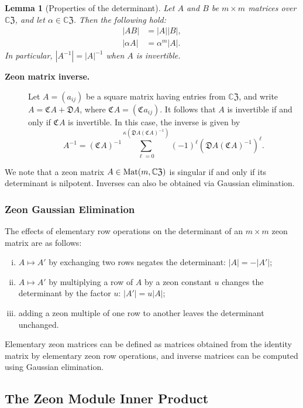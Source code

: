 \documentclass{article}
\newtheorem{lemma}[theorem]{Lemma}
\theoremstyle{definition}
\newcommand{\zco}{\mathfrak{C}\mspace{1mu}}
\newcommand{\CZ}{\mathbb{C}\mathfrak{Z}}
\newcommand{\Mat}{{\rm Mat}}
\numberwithin{equation}{section}
\begin{document}
\begin{lemma}[Properties of the determinant]
Let $A$ and $B$ be $m\times m$ matrices over $\CZ$, and let $\alpha\in\CZ$.  Then the following hold:\begin{align*}
|AB|&=|A| |B|,\\
|\alpha A|&=\alpha^m |A|.
\end{align*}
In particular, $|A^{-1}|=|A|^{-1}$ when $A$ is invertible.
\end{lemma}

\begin{description}
\item [{\bf Zeon matrix inverse.}] Let $A=(a_{ij})$ be a square matrix having entries from $\CZ$, and write $A=\zco A + \mathfrak{D}A$, where $\zco A=(\zco a_{ij})$.  It follows that $A$ is invertible if and only if $\zco A$ is invertible.  In this case, the inverse is given by \begin{equation*}
A^{-1}=(\zco A)^{-1}\sum_{\ell=0}^{\kappa(\mathfrak{D}A(\zco A)^{-1})}(-1)^\ell(\mathfrak{D}A(\zco A)^{-1})^{\ell}.
\end{equation*}
\end{description}

We note that a zeon matrix $A\in\Mat(m,\CZ)$ is singular if and only if its determinant is nilpotent.  Inverses can also be obtained via Gaussian elimination.

\subsubsection*{Zeon Gaussian Elimination}

The effects of elementary row operations on the determinant of an $m\times m$ zeon matrix are as follows:
\begin{enumerate}[i.]
\item $A\mapsto A'$ by exchanging two rows negates the determinant: $|A|=-|A'|$;
\item $A\mapsto A'$ by multiplying a row of $A$ by a zeon constant $u$ changes the determinant by the factor $u$: $|A'|= u|A|$;  
\item adding a zeon multiple of one row to another leaves the determinant unchanged.
\end{enumerate}

Elementary zeon matrices can be defined as matrices obtained from the identity matrix by elementary zeon row operations, and inverse matrices can be computed using Gaussian elimination.   


\subsection{The Zeon Module Inner Product}
\end{document}
